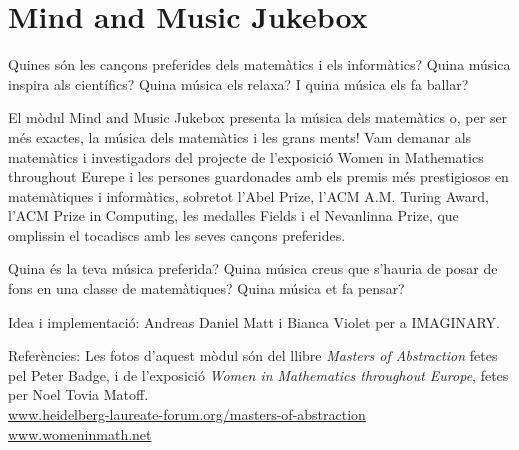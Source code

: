\section{Mind and Music Jukebox}
Quines són les cançons preferides dels matemàtics i els informàtics? Quina música inspira als científics? Quina música els relaxa? I quina música els fa ballar?

El mòdul Mind and Music Jukebox presenta la música dels matemàtics o, per ser més exactes, la música dels matemàtics i les grans ments! Vam demanar als matemàtics i investigadors del projecte de l'exposició Women in Mathematics throughout Eurepe i les persones guardonades amb els premis més prestigiosos en matemàtiques i informàtics, sobretot l'Abel Prize, l'ACM A.M. Turing Award, l'ACM Prize in Computing, les medalles Fields i el Nevanlinna Prize, que omplissin el tocadiscs amb les seves cançons preferides.

Quina és la teva música preferida? Quina música creus que s'hauria de posar de fons en una classe de matemàtiques? Quina música et fa pensar?

\begin{sectcredits}
\item[Idea i implementació:] Andreas Daniel Matt i Bianca Violet per a IMAGINARY.

\item[Referències:]
Les fotos d'aquest mòdul són del llibre \emph{Masters of Abstraction} fetes pel Peter Badge, i de l'exposició \emph{Women in Mathematics throughout Europe}, fetes per Noel Tovia Matoff.
\\ \url{www.heidelberg-laureate-forum.org/masters-of-abstraction}
\\ \url{www.womeninmath.net}

\end{sectcredits}
